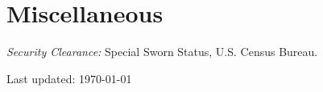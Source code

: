 \documentclass[10pt,letterpaper]{article}
\renewenvironment{itemize}{
  \begin{list}{}{
    \setlength{\leftmargin}{1.5em}
    \setlength{\itemsep}{0.25em}
    \setlength{\parskip}{0pt}
    \setlength{\parsep}{0.25em}
  }
}{
  \end{list}
}
\begin{document}

\section*{Miscellaneous}

\begin{itemize}
\item \textit{Security Clearance:} Special Sworn Status, U.S. Census Bureau.
\end{itemize}

\medskip

\begin{center}
  \begin{small}
    Last updated: \today
  \end{small}
\end{center}
\end{document}
